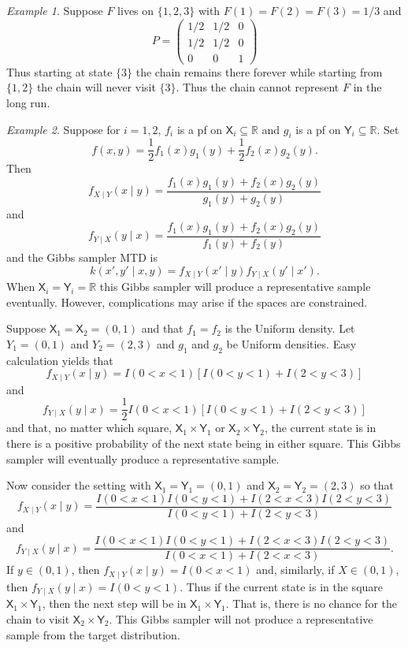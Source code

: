 \documentclass[12pt]{article}
\theoremstyle{plain}
\theoremstyle{definition}
\theoremstyle{remark}
\newtheorem{example}{Example}[section]
\newcommand{\X}{\mathsf{X}}
\newcommand{\Y}{\mathsf{Y}}
\newcommand{\real}{\mathbb{R}}
\begin{document}
 \begin{example}
Suppose $F$ lives on $\{ 1, 2,3\}$ with $F(1) =  F(2) = F(3) = 1/3$ and
   \[
     P = \begin{pmatrix}
       1/2 & 1/2 & 0 \\
       1/2 & 1/2 & 0\\
       0 & 0 & 1
       \end{pmatrix}
     \]
     Thus starting at state $\{3\}$ the chain remains there forever
     while starting from $\{1, 2\}$ the chain will never visit
     $\{3\}$.  Thus the chain cannot represent $F$ in the long run.
 \end{example}
 

 \begin{example}
   \label{mcmc:ex:disc_Gibbs}
Suppose for $i=1,2$, $f_i$ is a pf on $\X_i \subseteq \real$ and $g_i$
is a pf on $\Y_i \subseteq \real$.
Set
\[
f(x,y) = \frac{1}{2} f_1(x) g_1(y) + \frac{1}{2} f_2(x) g_2(y).
\]
Then
\[
f_{X \mid Y}(x \mid y) = \frac{f_1(x) g_1(y) + f_2(x) g_2(y)}{g_1(y) + g_2(y)}
\]
and
\[
f_{Y\mid X}(y \mid x) = \frac{f_1(x) g_1(y) + f_2(x) g_2(y)}{f_1(y) + f_2(y)}
\]
and the Gibbs sampler MTD is
\[
k(x', y' \mid x, y) = f_{X \mid Y}(x' \mid y) f_{Y\mid X}(y' \mid x') .
\]
When $\X_i = \Y_i = \real$ this Gibbs sampler will produce a
representative sample eventually.  However, complications may arise if
the spaces are constrained.

Suppose $\X_1 = \X_2 = (0, 1)$ and that $f_1 = f_2$ is the
Uniform density.  Let $Y_1 = (0, 1)$ and $Y_2 = (2, 3)$ and $g_1$
and $g_2$ be Uniform densities.  Easy calculation yields that
\[
f_{X \mid Y} (x \mid y) = I(0 < x < 1) \left[ I(0 < y < 1) + I(2 < y <
3)\right]
\]
and
\[
f_{Y \mid X}(y \mid x) = \frac{1}{2} I(0 < x < 1) \left[ I(0 < y < 1) + I(2 < y <
3)\right]
\]
and that, no matter which square, $\X_1 \times \Y_1$ or $\X_2 \times
\Y_2$,  the current state is in there is a positive probability of the
next state being in either square.  This Gibbs sampler will eventually
produce a representative sample.

Now consider the setting with $\X_1 = \Y_1 = (0,1)$ and $\X_2 = \Y_2 =
(2,3)$ so that
\[
f_{X \mid Y} (x \mid y) = \frac{I(0 < x < 1) I(0 < y < 1) + I(2 < x < 3)I(2 < y <
3)}{I(0 < y < 1) + I(2 < y < 3)}
\]
and
\[
f_{Y \mid X} (y \mid x) = \frac{I(0 < x < 1) I(0 < y < 1) + I(2 < x < 3)I(2 < y <
3)}{I(0 < x < 1) + I(2 < x < 3)}.
\]
If $ y \in (0,1)$, then $f_{X \mid Y} (x \mid y) =  I(0 < x <1)$ and,
similarly, if $X \in (0,1)$, then $f_{Y \mid X} (y \mid x) = I(0 < y <
1)$.  Thus if the current state is in the square $\X_1 \times \Y_1$,
then the next step will be in $\X_1 \times \Y_1$.  That is, there is
no chance for the chain to visit $\X_2 \times \Y_2$.  This Gibbs
sampler will not produce a representative sample from the target
distribution.
\end{example}
\end{document}
